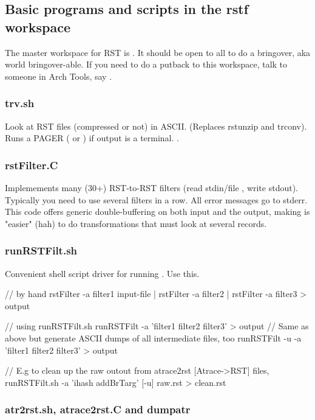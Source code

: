 \documentclass[10pt]{article}
\begin{document}
\subsection{Basic programs and scripts in the rstf workspace}

The master workspace for RST is .
It should be open to all to do a bringover, aka world bringover-able.
If you need to do a putback to this workspace, talk to someone in Arch
Tools, say .

\subsubsection{trv.sh}

Look at RST files (compressed or not) in ASCII.  (Replaces rstunzip and
trconv).  Runs a PAGER (  or  ) if output is a
terminal.  .

\subsubsection{rstFilter.C}

Implemements many (30+) RST-to-RST filters (read stdin/file , write
stdout).  Typically you need to use several filters in a row.  All error
messages go to stderr.  This code offers generic double-buffering on
both input and the output, making is "easier" (hah) to do
transformations that must look at several records.

\subsubsection{runRSTFilt.sh}

Convenient shell script driver for running .  Use
this.

\begin{rqcode}{ }
  // by hand
rstFilter -a filter1 input-file | rstFilter -a filter2 | rstFilter -a
filter3 > output

  // using runRSTFilt.sh
runRSTFilt -a 'filter1 filter2 filter3' > output
  // Same as above but generate ASCII dumps of all intermediate files, too
runRSTFilt -u -a 'filter1 filter2 filter3' > output

  // E.g to clean up the raw outout from atrace2rst [Atrace->RST] files,
runRSTFilt.sh -a 'ihash addBrTarg' [-u] raw.rst > clean.rst
\end{rqcode}

\subsubsection{atr2rst.sh, atrace2rst.C and dumpatr}
\end{document}
